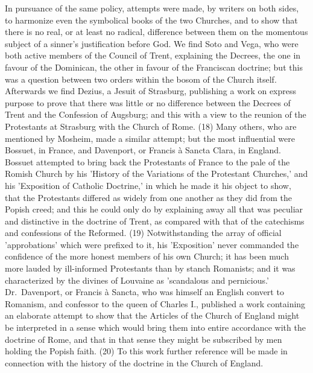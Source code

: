 \documentclass[
]{book}
\begin{document}
In pursuance of the same policy, attempts were made, by writers on both sides, to harmonize even the symbolical books of the two Churches, and to show that there is no real, or at least no radical, difference between them on the momentous subject of a sinner's justification before God. We find Soto and Vega, who were both active members of the Council of Trent, explaining the Decrees, the one in favour of the Dominican, the other in favour of the Franciscan doctrine; but this was a question between two orders within the bosom of the Church itself. Afterwards we find Dezius, a Jesuit of Strasburg, publishing a work on express purpose to prove that there was little or no difference between the Decrees of Trent and the Confession of Augsburg; and this with a view to the reunion of the Protestants at Strasburg with the Church of Rome. (18) Many others, who are mentioned by Mosheim, made a similar attempt; but the most influential were Bossuet, in France, and Davenport, or Francis à Sancta Clara, in England. Bossuet attempted to bring back the Protestants of France to the pale of the Romish Church by his 'History of the Variations of the Protestant Churches,' and his 'Exposition of Catholic Doctrine,' in which he made it his object to show, that the Protestants differed as widely from one another as they did from the Popish creed; and this he could only do by explaining away all that was peculiar and distinctive in the doctrine of Trent, as compared with that of the catechisms and confessions of the Reformed. (19) Notwithstanding the array of official 'approbations' which were prefixed to it, his 'Exposition' never commanded the confidence of the more honest members of his own Church; it has been much more lauded by ill-informed Protestants than by stanch Romanists; and it was characterized by the divines of Louvaine as 'scandalous and pernicious.' Dr.~Davenport, or Francis à Sancta, who was himself an English convert to Romanism, and confessor to the queen of Charles I., published a work containing an elaborate attempt to show that the Articles of the Church of England might be interpreted in a sense which would bring them into entire accordance with the doctrine of Rome, and that in that sense they might be subscribed by men holding the Popish faith. (20) To this work further reference will be made in connection with the history of the doctrine in the Church of England.
\end{document}
